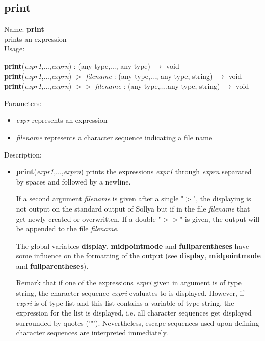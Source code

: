 \subsection{print}
\label{labprint}
\noindent Name: \textbf{print}\\
prints an expression\\

\noindent Usage: 
\begin{center}
\textbf{print}(\emph{expr1},...,\emph{exprn}) : (\textsf{any type},..., \textsf{any type}) $\rightarrow$ \textsf{void}\\
\textbf{print}(\emph{expr1},...,\emph{exprn}) $>$ \emph{filename} : (\textsf{any type},..., \textsf{any type}, \textsf{string}) $\rightarrow$ \textsf{void}\\
\textbf{print}(\emph{expr1},...,\emph{exprn}) $>>$ \emph{filename} : (\textsf{any type},...,\textsf{any type}, \textsf{string}) $\rightarrow$ \textsf{void}\\
\end{center}
Parameters: 
\begin{itemize}
\item \emph{expr} represents an expression
\item \emph{filename} represents a character sequence indicating a file name
\end{itemize}
\noindent Description: \begin{itemize}

\item \textbf{print}(\emph{expr1},...,\emph{exprn}) prints the expressions \emph{expr1} through
   \emph{exprn} separated by spaces and followed by a newline.
    
   If a second argument \emph{filename} is given after a single  "$>$", the
   displaying is not output on the standard output of Sollya but if in
   the file \emph{filename} that get newly created or overwritten. If a double
    "$>>$" is given, the output will be appended to the file \emph{filename}.
    
   The global variables \textbf{display}, \textbf{midpointmode} and \textbf{fullparentheses} have
   some influence on the formatting of the output (see \textbf{display},
   \textbf{midpointmode} and \textbf{fullparentheses}).
    
   Remark that if one of the expressions \emph{expri} given in argument is of
   type \textsf{string}, the character sequence \emph{expri} evaluates to is
   displayed. However, if \emph{expri} is of type \textsf{list} and this list
   contains a variable of type \textsf{string}, the expression for the list
   is displayed, i.e.  all character sequences get displayed surrounded
   by quotes ('"'). Nevertheless, escape sequences used upon defining
   character sequences are interpreted immediately.
\end{itemize}
